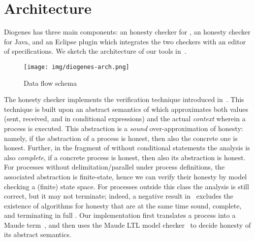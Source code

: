 \section{Architecture}

Diogenes has three main components:
an honesty checker for \coco,
an honesty checker for Java,
and an Eclipse plugin which integrates the two checkers
with an editor of \coco specifications.
We sketch the architecture of our tools in~.

\begin{figure}[t]
    \texttt{[image: img/diogenes-arch.png]}
    \caption{Data flow schema}
    \label{fig:architecture}
\end{figure}

The \coco honesty checker implements the  
verification technique introduced in~\cite{BMSZ15jlamp}.
This technique is built upon an abstract semantics of \coco 
which approximates both values (sent, received, and in conditional expressions) 
and the actual \emph{context} wherein a process is executed.
This abstraction is a \emph{sound} over-approximation of honesty:
namely, if the abstraction of a process is honest,
then also the concrete one is honest.
Further, in the fragment of \coco without conditional statements
the analysis is also \emph{complete},
\ie if a concrete process is honest, then also its abstraction is honest.
For processes without delimitation/parallel under process definitions,
the associated abstraction is finite-state, 
hence we can verify their honesty by model checking a (finite) state space.
For processes outside this class the analysis is still correct, 
but it may not terminate; indeed, a negative result in~\cite{BZ15wsfm}
excludes the existence of algorithms for honesty that are at the same time
sound, complete, and terminating in full \coco.
Our implementation 
first translates a \coco process into a Maude term~\cite{Maude01}, 
and then uses the Maude LTL model checker~\cite{Eker02maude}
to decide honesty of its abstract semantics.


